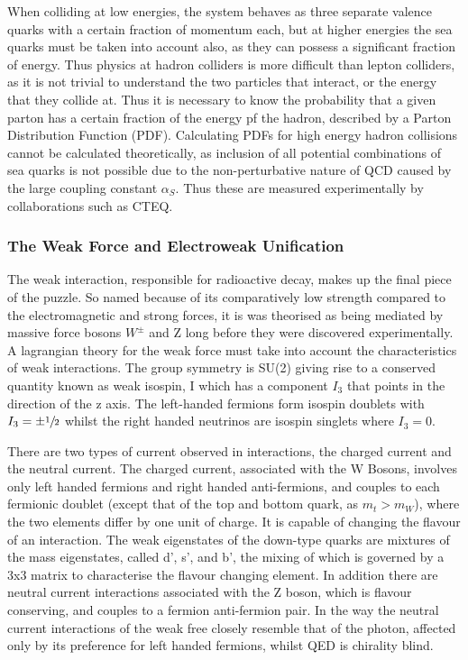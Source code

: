  When colliding at low energies, the system behaves as three separate valence quarks with a certain fraction of momentum each, but at higher energies the sea quarks must be taken into account also, as they can possess a significant fraction of energy.  Thus physics at hadron colliders is more difficult than lepton colliders, as it is not trivial to understand the two particles that interact, or the energy that they collide at. Thus it is necessary to know the probability that a given parton has a certain fraction of the energy pf the hadron,  described by a Parton Distribution Function (PDF). Calculating PDFs for high energy hadron collisions cannot be calculated theoretically, as inclusion of all potential combinations of sea quarks is not possible due to the non-perturbative nature of QCD caused by the large coupling constant $\alpha_{S}$. Thus these are measured experimentally by collaborations such as CTEQ. 
 


\subsubsection{The Weak Force and Electroweak Unification}

The weak interaction, responsible for radioactive decay, makes up the final piece of the puzzle. So named because of its comparatively low strength compared to the electromagnetic and strong forces, it is was theorised as being mediated by massive force bosons $W^{\pm}$ and Z long before they were discovered experimentally. A lagrangian theory for the weak force must take into account the characteristics of weak interactions. The group symmetry is SU(2) giving rise to a conserved quantity known as weak isospin, I which has a component $I_{3}$ that points in the direction of the z axis. The left-handed fermions form isospin doublets with $I_{3} = \pm \sfrac{1}{2}$ whilst the right handed neutrinos are isospin singlets where $I_{3} = 0$.

There are two types of current observed in interactions, the charged current and the neutral current\cite{PichSM}. The charged current, associated with the W Bosons, involves only left handed fermions and right handed anti-fermions, and couples to each fermionic doublet (except that of the top and bottom quark, as $m_{t} > m_{W}$), where the two elements differ by one unit of charge. It is capable of changing the flavour of an interaction. The weak eigenstates of the down-type quarks are mixtures of the mass eigenstates, called d', s', and b', the mixing of which is governed by a 3x3 matrix to characterise the flavour changing element.  In addition there are neutral current interactions associated with the Z boson, which is flavour conserving, and couples to a fermion anti-fermion pair. In the way the neutral current interactions of the weak free closely resemble that of the photon, affected only by its preference for left handed fermions, whilst QED is chirality blind. 

